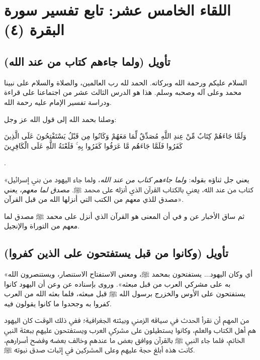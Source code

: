 \chapter{اللقاء الخامس عشر: تابع تفسير سورة البقرة (٤)}

\section{تأويل (ولما جاءهم كتاب من عند الله)}
السلام عليكم ورحمة الله وبركاته. الحمد لله رب العالمين، والصلاة والسلام على نبينا محمد وعلى آله وصحبه وسلم. هذا هو الدرس الثالث عشر من اجتماعنا على قراءة ودراسة تفسير الإمام  عليه رحمة الله.

وصلنا بحمد الله إلى قول الله عز وجل: \begin{ayah}وَلَمَّا جَاءَهُمْ كِتَابٌ مِّنْ عِندِ اللَّهِ مُصَدِّقٌ لِّمَا مَعَهُمْ وَكَانُوا مِن قَبْلُ يَسْتَفْتِحُونَ عَلَى الَّذِينَ كَفَرُوا فَلَمَّا جَاءَهُم مَّا عَرَفُوا كَفَرُوا بِهِ ۚ فَلَعْنَةُ اللَّهِ عَلَى الْكَافِرِينَ\end{ayah}.

 «يعني جل ثناؤه بقوله: \textit{ولما جاءهم كتاب من عند الله}، ولما جاء اليهود من بني إسرائيل كتاب من عند الله، يعني بالكتاب القرآن الذي أنزله على محمد ﷺ. \textit{مصدق لما معهم}، يعني مصدق للذي معهم من الكتب التي أنزلها الله من قبل القرآن».

ثم ساق  الأخبار عن  و في أن المعنى هو القرآن الذي أنزل على محمد ﷺ مصدق لما معهم من التوراة والإنجيل.

\section{تأويل (وكانوا من قبل يستفتحون على الذين كفروا)}
 «أي وكان اليهود... يستفتحون بمحمد ﷺ، ومعنى الاستفتاح الاستنصار، ويستنصرون الله به على مشركي العرب من قبل مبعثه».
وروى  بإسناده عن  وعن  أن اليهود كانوا يستفتحون على الأوس والخزرج برسول الله ﷺ قبل مبعثه، فلما بعثه الله من العرب كفروا به وجحدوا ما كانوا يقولون فيه.

\begin{fawaid}
من المهم أن نقرأ الحدث في سياقه الزمني وبيئته الجغرافية؛ ففي ذلك الوقت كان اليهود هم أهل الكتاب والعلم، وكانوا يستطيلون على مشركي العرب ويستفتحون عليهم ببعثة النبي الخاتم، فلما جاء النبي ﷺ بالقرآن ووافق بعض ما عندهم وخالف بعضه وفضح أسرارهم، كانت هذه أبلغ حجة عليهم وعلى المشركين في إثبات صدق نبوته ﷺ.
\end{fawaid}


